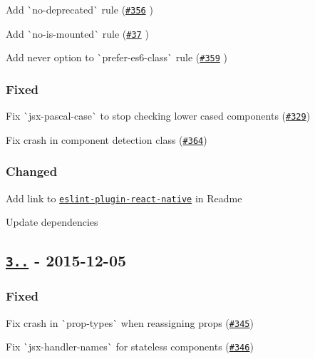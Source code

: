 \begin{DoxyItemize}
\item Add \`{}no-\/deprecated\`{} rule (\href{https://github.com/yannickcr/eslint-plugin-react/pull/356}{\tt \#356} )
\item Add \`{}no-\/is-\/mounted\`{} rule (\href{https://github.com/yannickcr/eslint-plugin-react/issues/37}{\tt \#37} )
\item Add {\ttfamily never} option to \`{}prefer-\/es6-\/class\`{} rule (\href{https://github.com/yannickcr/eslint-plugin-react/pull/359}{\tt \#359} )
\end{DoxyItemize}

\subsubsection*{Fixed}


\begin{DoxyItemize}
\item Fix \`{}jsx-\/pascal-\/case\`{} to stop checking lower cased components (\href{https://github.com/yannickcr/eslint-plugin-react/issues/329}{\tt \#329})
\item Fix crash in component detection class (\href{https://github.com/yannickcr/eslint-plugin-react/issues/364}{\tt \#364})
\end{DoxyItemize}

\subsubsection*{Changed}


\begin{DoxyItemize}
\item Add link to \href{https://github.com/Intellicode/eslint-plugin-react-native}{\tt eslint-\/plugin-\/react-\/native} in Readme
\item Update dependencies
\end{DoxyItemize}

\subsection*{\href{https://github.com/yannickcr/eslint-plugin-react/compare/v3.11.2...v3.11.3}{\tt 3..} -\/ 2015-\/12-\/05}

\subsubsection*{Fixed}


\begin{DoxyItemize}
\item Fix crash in \`{}prop-\/types\`{} when reassigning props (\href{https://github.com/yannickcr/eslint-plugin-react/issues/345}{\tt \#345})
\item Fix \`{}jsx-\/handler-\/names\`{} for stateless components (\href{https://github.com/yannickcr/eslint-plugin-react/issues/346}{\tt \#346})
\end{DoxyItemize}

